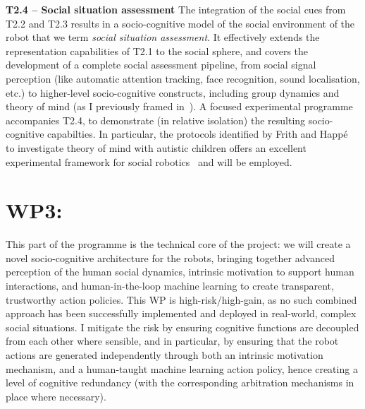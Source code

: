 \documentclass[11pt,a4paper]{report}
\begin{document}
\textbf{T2.4 -- Social situation assessment} The integration of the social cues
from T2.2 and T2.3 results in a socio-cognitive model of the social environment
of the robot that we term \emph{social situation assessment}.  It effectively
extends the representation capabilities of T2.1 to the social sphere, and covers
the development of a complete social assessment pipeline, from social signal
perception (like automatic attention tracking, face recognition, sound
localisation, etc.) to higher-level socio-cognitive constructs, including group
dynamics and theory of mind (as I previously framed
in~\cite{lemaignan2015mutual, dillenbourg2016symmetry}). A focused experimental
programme accompanies T2.4, to demonstrate (in relative isolation) the resulting
socio-cognitive capabilties. In particular, the protocols identified by Frith
and Happé~\cite{frith1994autism} to investigate theory of mind with autistic
children offers an excellent experimental framework for social
robotics~\cite{lemaignan2015mutual} and will be employed.


\section{WP3: \textbf{\wpThree}}

\noindent{}


This part of the programme is the technical core of the project: we will create a
novel socio-cognitive architecture for the robots, bringing together advanced
perception of the human social dynamics, intrinsic motivation to support human
interactions, and human-in-the-loop machine learning to create transparent,
trustworthy action policies. This WP is high-risk/high-gain, as no such combined
approach has been successfully implemented and deployed in real-world, complex
social situations. I mitigate the risk by ensuring cognitive functions are
decoupled from each other where sensible, and in particular, by ensuring that
the robot actions are generated independently through both an intrinsic
motivation mechanism, and a human-taught machine learning action policy, hence
creating a level of cognitive redundancy (with the corresponding arbitration
mechanisms in place where necessary).
\end{document}
